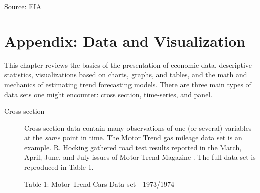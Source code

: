 \documentclass[]{book}
\theoremstyle{definition}
\theoremstyle{definition}
\theoremstyle{remark}
\begin{document}
Source: EIA

\chapter{Appendix: Data and
Visualization}\label{appendix-data-and-visualization}

This chapter reviews the basics of the presentation of economic data,
descriptive statistics, visualizations based on charts, graphs, and
tables, and the math and mechanics of estimating trend forecasting
models. There are three main types of data sets one might encounter:
cross section, time-series, and panel.

\begin{description}
\item[Cross section]
Cross section data contain many observations of one (or several)
variables at the \emph{same} point in time. The Motor Trend gas mileage
data set is an example. R. Hocking gathered road test results reported
in the March, April, June, and July issues of Motor Trend Magazine
\citep{hocking1976biometrics}. The full data set is reproduced in Table
1.

Table 1: Motor Trend Cars Data set - 1973/1974
\end{description}
\end{document}
